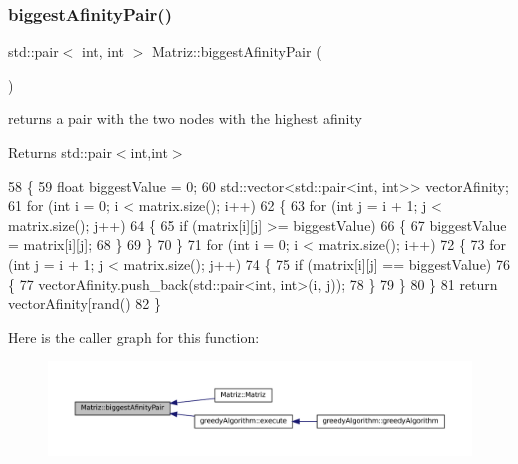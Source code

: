 \subsubsection{\texorpdfstring{biggest\+Afinity\+Pair()}{biggestAfinityPair()}}
{\footnotesize\ttfamily std\+::pair$<$ int, int $>$ Matriz\+::biggest\+Afinity\+Pair (\begin{DoxyParamCaption}{ }\end{DoxyParamCaption})}



returns a pair with the two nodes with the highest afinity 

\begin{DoxyReturn}{Returns}
std\+::pair$<$int,int$>$ 
\end{DoxyReturn}

\begin{DoxyCode}
58 \{
59   \textcolor{keywordtype}{float} biggestValue = 0;
60   std::vector<std::pair<int, int>> vectorAfinity;
61   \textcolor{keywordflow}{for} (\textcolor{keywordtype}{int} i = 0; i < matrix.size(); i++)
62   \{
63     \textcolor{keywordflow}{for} (\textcolor{keywordtype}{int} j = i + 1; j < matrix.size(); j++)
64     \{
65       \textcolor{keywordflow}{if} (matrix[i][j] >= biggestValue)
66       \{
67         biggestValue = matrix[i][j];
68       \}
69     \}
70   \}
71   \textcolor{keywordflow}{for} (\textcolor{keywordtype}{int} i = 0; i < matrix.size(); i++)
72   \{
73     \textcolor{keywordflow}{for} (\textcolor{keywordtype}{int} j = i + 1; j < matrix.size(); j++)
74     \{
75       \textcolor{keywordflow}{if} (matrix[i][j] == biggestValue)
76       \{
77         vectorAfinity.push\_back(std::pair<int, int>(i, j));
78       \}
79     \}
80   \}
81   \textcolor{keywordflow}{return} vectorAfinity[rand() %
82 \}
\end{DoxyCode}
Here is the caller graph for this function\+:
\nopagebreak
\begin{figure}[H]
\begin{center}
\leavevmode
\includegraphics[width=350pt]{classMatriz_a30e8aba7a2868aaa98f11d3037ff8319_icgraph}
\end{center}
\end{figure}
\mbox{\label{classMatriz_ad6915f9b31f93230a3ce05d01d23a47b}} 
